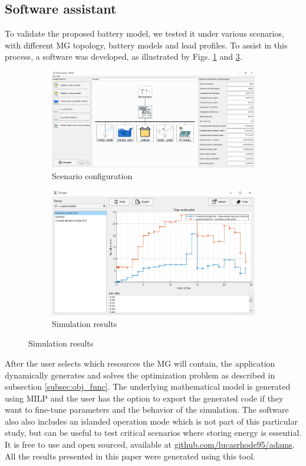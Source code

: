 \documentclass{ieeeaccess}
\begin{document}
    \subsection{Software assistant}
    To validate the proposed battery model, we tested it under various scenarios, with different \ac{MG} topology, battery models and load profiles. To assist in this process, a software was developed, as illustrated by Figs. \ref{fig:adams1} and \ref{fig:adams2}.
    \begin{figure}[!h]
    	\centering
    	\begin{subfigure}{0.45\textwidth}
    		\includegraphics[width=\linewidth]{figures/ss1.png}
    		\caption{Scenario configuration}
    		\label{fig:adams1}
    	\end{subfigure}

    	\begin{subfigure}{0.45\textwidth}
    		\includegraphics[width=\linewidth]{figures/ss2.png}
    		\caption{Simulation results}
    		\label{fig:adams2}
    	\end{subfigure}
    \end{figure}
	After the user selects which resources the \ac{MG} will contain, the application dynamically generates and solves the optimization problem as described in subsection \ref{subsec:obj_func}. The underlying mathematical model is generated using \ac{MILP} and the user has the option to export the generated code if they want to fine-tune parameters and the behavior of the simulation. The software also also includes an islanded operation mode which is not part of this particular study, but can be useful to test critical scenarios where storing energy is essential. It is free to use and open sourced, available at \href{https://github.com/lucasrhode95/adams}{github.com/lucasrhode95/adams}. All the results presented in this paper were generated using this tool.
\end{document}
